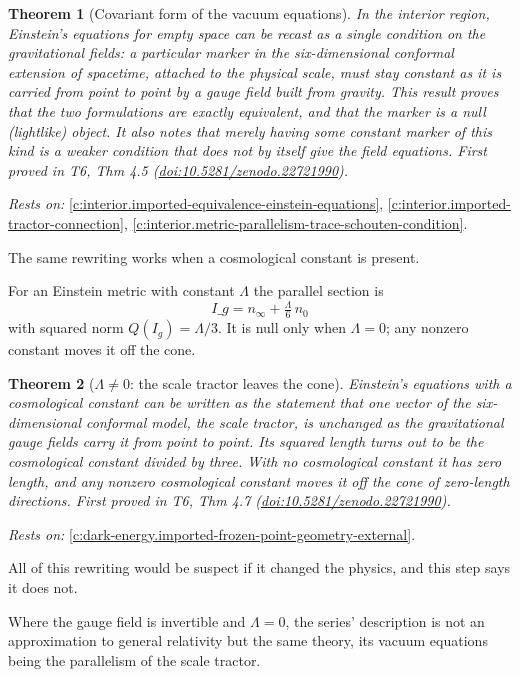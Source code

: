 \documentclass[11pt]{article}
\newtheorem{theorem}{Theorem}[section]
\theoremstyle{definition}
\theoremstyle{plain}
\providecommand{\nInf}{}\renewcommand{\nInf}{n_\infty}
\providecommand{\nO}{}\renewcommand{\nO}{n_0}
\begin{document}
\begin{theorem}[Covariant form of the vacuum equations]\label{c:interior.covariant-form-vacuum-equations}
In the interior region, Einstein's equations for empty space can be recast as a single condition on the gravitational fields: a particular marker in the six-dimensional conformal extension of spacetime, attached to the physical scale, must stay constant as it is carried from point to point by a gauge field built from gravity. This result proves that the two formulations are exactly equivalent, and that the marker is a null (lightlike) object. It also notes that merely having some constant marker of this kind is a weaker condition that does not by itself give the field equations.
\emph{First proved in} T6, Thm 4.5 (\href{https://doi.org/10.5281/zenodo.22721990}{doi:10.5281/zenodo.22721990}).
\end{theorem}
\noindent\emph{Rests on:} \ref{c:interior.imported-equivalence-einstein-equations}, \ref{c:interior.imported-tractor-connection}, \ref{c:interior.metric-parallelism-trace-schouten-condition}.

The same rewriting works when a cosmological constant is present.

For an Einstein metric with constant $\Lambda$ the parallel section is \[ I\_g = \nInf + \tfrac{\Lambda}{6}\,\nO \] with squared norm $Q(I_g) = \Lambda/3$. It is null only when $\Lambda = 0$; any nonzero constant moves it off the cone.

\begin{theorem}[$\Lambda \neq 0$: the scale tractor leaves the cone]\label{c:interior.scale-tractor-leaves-cone}
Einstein's equations with a cosmological constant can be written as the statement that one vector of the six-dimensional conformal model, the scale tractor, is unchanged as the gravitational gauge fields carry it from point to point. Its squared length turns out to be the cosmological constant divided by three. With no cosmological constant it has zero length, and any nonzero cosmological constant moves it off the cone of zero-length directions.
\emph{First proved in} T6, Thm 4.7 (\href{https://doi.org/10.5281/zenodo.22721990}{doi:10.5281/zenodo.22721990}).
\end{theorem}
\noindent\emph{Rests on:} \ref{c:dark-energy.imported-frozen-point-geometry-external}.

All of this rewriting would be suspect if it changed the physics, and this step says it does not.

Where the gauge field is invertible and $\Lambda = 0$, the series' description is not an approximation to general relativity but the same theory, its vacuum equations being the parallelism of the scale tractor.
\end{document}
